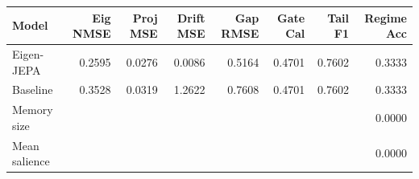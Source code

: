 \begin{tabular}{lrrrrrrr}
\toprule
Model & Eig NMSE & Proj MSE & Drift MSE & Gap RMSE & Gate Cal & Tail F1 & Regime Acc \\
\midrule
Eigen-JEPA & 0.2595 & 0.0276 & 0.0086 & 0.5164 & 0.4701 & 0.7602 & 0.3333 \\
Baseline & 0.3528 & 0.0319 & 1.2622 & 0.7608 & 0.4701 & 0.7602 & 0.3333 \\
\midrule
Memory size & \multicolumn{7}{r}{0.0000} \\
Mean salience & \multicolumn{7}{r}{0.0000} \\
\bottomrule
\end{tabular}